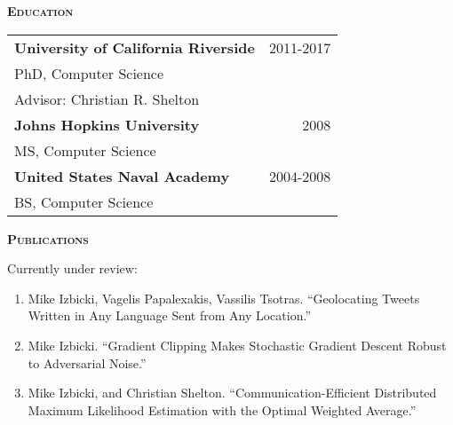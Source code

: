 \documentclass[12pt]{article}
\begin{document}

\vspace{0.15in}
\noindent
{{\scshape \bfseries {Education}}}
\vspace{0.05in}


\noindent
\begin{tabularx}{\textwidth}{Xr}
\textbf{University of California Riverside} & 2011-2017 \\
PhD, Computer Science \\
Advisor: Christian R. Shelton \vspace{0.05in}& \\

\textbf{Johns Hopkins University} & 2008 \\
MS, Computer Science \vspace{0.05in}& \\

\textbf{United States Naval Academy} & 2004-2008 \\
BS, Computer Science \vspace{0.05in}& \\

\end{tabularx}


\vspace{0.15in}
\noindent
{{\scshape \bfseries {Publications}}}
\vspace{0.05in}

\noindent
Currently under review:
\begin{enumerate}
\item
Mike Izbicki, Vagelis Papalexakis, Vassilis Tsotras.
``Geolocating Tweets Written in Any Language Sent from Any Location.''

\item
Mike Izbicki.
``Gradient Clipping Makes Stochastic Gradient Descent Robust to Adversarial Noise.''

\item
Mike Izbicki, and Christian Shelton.
``Communication-Efficient Distributed Maximum Likelihood Estimation with the Optimal Weighted Average.''

\end{enumerate}
\end{document}
